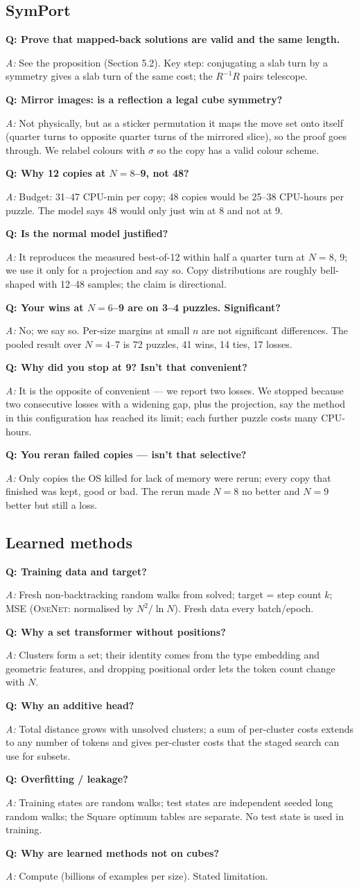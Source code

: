 \documentclass[10.5pt,a4paper]{article}
\newcommand{\M}[1]{\textsc{#1}}
\newcommand{\Q}[1]{\par\smallskip\textbf{Q: #1}\par}
\newcommand{\A}{\textit{A:} }
\begin{document}
\subsection{SymPort}
\Q{Prove that mapped-back solutions are valid and the same length.} \A See the proposition (Section 5.2). Key step: conjugating a
slab turn by a symmetry gives a slab turn of the same cost; the $R^{-1}R$ pairs telescope.
\Q{Mirror images: is a reflection a legal cube symmetry?} \A Not physically, but as a sticker permutation it maps the move set onto
itself (quarter turns to opposite quarter turns of the mirrored slice), so the proof goes through. We relabel colours with $\sigma$ so
the copy has a valid colour scheme.
\Q{Why 12 copies at $N=8$--9, not 48?} \A Budget: 31--47 CPU-min per copy; 48 copies would be 25--38 CPU-hours per puzzle. The model
says 48 would only just win at 8 and not at 9.
\Q{Is the normal model justified?} \A It reproduces the measured best-of-12 within half a quarter turn at $N=8$, 9; we use it only
for a projection and say so. Copy distributions are roughly bell-shaped with 12--48 samples; the claim is directional.
\Q{Your wins at $N=6$--9 are on 3--4 puzzles. Significant?} \A No; we say so. Per-size margins at small $n$ are not significant
differences. The pooled result over $N=4$--7 is 72 puzzles, 41 wins, 14 ties, 17 losses.
\Q{Why did you stop at 9? Isn't that convenient?} \A It is the opposite of convenient --- we report two losses. We stopped because two
consecutive losses with a widening gap, plus the projection, say the method in this configuration has reached its limit; each further
puzzle costs many CPU-hours.
\Q{You reran failed copies --- isn't that selective?} \A Only copies the OS killed for lack of memory were rerun; every copy that
finished was kept, good or bad. The rerun made $N=8$ no better and $N=9$ better but still a loss.

\subsection{Learned methods}
\Q{Training data and target?} \A Fresh non-backtracking random walks from solved; target = step count $k$; MSE (\M{OneNet}:
normalised by $N^2/\ln N$). Fresh data every batch/epoch.
\Q{Why a set transformer without positions?} \A Clusters form a set; their identity comes from the type embedding and geometric
features, and dropping positional order lets the token count change with $N$.
\Q{Why an additive head?} \A Total distance grows with unsolved clusters; a sum of per-cluster costs extends to any number of tokens
and gives per-cluster costs that the staged search can use for subsets.
\Q{Overfitting / leakage?} \A Training states are random walks; test states are independent seeded long random walks; the Square
optimum tables are separate. No test state is used in training.
\Q{Why are learned methods not on cubes?} \A Compute (billions of examples per size). Stated limitation.
\end{document}
